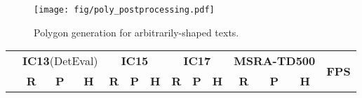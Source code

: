 \documentclass[10pt,twocolumn,letterpaper]{article}
\begin{document}
\begin{figure}[t]
 \begin{center}
   \texttt{[image: fig/poly\_postprocessing.pdf]}
\vspace{-1mm}
   \caption{Polygon generation for arbitrarily-shaped texts.}
   \label{fig:poly_postprocessing} 
   \vspace{-5mm}
  \end{center}
\end{figure}


\begin{table*}[t!]
  \centering
\tabcolsep=0.2cm
  \fontsize{10}{10}\selectfont
  \renewcommand*{\arraystretch}{1.1}
  \begin{tabular}{c||c|c|c||c|c|c||c|c|c||c|c|c||c}
    \hline 
    \rule{0pt}{10pt} \multirow{2}{*}{\textbf{Method}} & \multicolumn{3}{c||}{\textbf{IC13}(DetEval)} & \multicolumn{3}{c||}{\textbf{IC15}} & \multicolumn{3}{c||}{\textbf{IC17}} & \multicolumn{3}{c||}{\textbf{MSRA-TD500}} & \multirow{2}{*}{\textbf{FPS}}\\
    \cline{2-13}
    \rule{0pt}{10pt} & \textbf{R} & \textbf{P} & \textbf{H} & \textbf{R} & \textbf{P} & \textbf{H} & \textbf{R} & \textbf{P} & \textbf{H} & \textbf{R} & \textbf{P} & \textbf{H} &\\
    \hline
    \hline


\end{tabular}
\end{table*}
\end{document}
